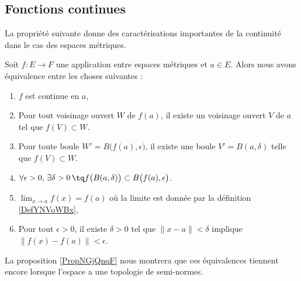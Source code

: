 \subsection{Fonctions continues}

La propriété suivante donne des caractérisations importantes de la continuité dans le cas des espaces métriques.
\begin{proposition} \label{PropQZRNpMn}
    Soit \( f\colon E\to F\) une application entre espaces métriques et \( a\in E\). Alors nous avons équivalence entre les choses suivantes :
    \begin{enumerate}
        \item\label{ItemCBUoRWJi}
            \( f\) est continue en \( a\),
        \item\label{ItemCBUoRWJii}
            Pour tout voisinage ouvert \( W\) de \( f(a)\), il existe un voisinage ouvert \( V\) de \( a\) tel que \( f(V)\subset W\).
        \item\label{ItemCBUoRWJiii}
            Pour toute boule \( W'=B\big( f(a),\epsilon \big)\), il existe une boule \( V'=B(a,\delta)\) telle que \( f(V)\subset W\).
        \item\label{ItemCBUoRWJiv}
            $\forall \epsilon>0,\,\exists \delta>0\,\tq f\big( B(a,\delta) \big)\subset B\big( f(a),\epsilon \big)$.
        \item\label{ItemYNQpikrii}
            \( \lim_{x\to a}f(x)=f(a)\) où la limite est donnée par la définition \ref{DefYNVoWBx},
        \item\label{ItemYNQpikriii}
            Pour tout \( \epsilon>0\), il existe \( \delta>0\) tel que \( \| x-a \|<\delta\) implique \( \| f(x)-f(a) \|<\epsilon\).
    \end{enumerate}
\end{proposition}
La proposition \ref{PropNGjQnqF} nous montrera que ces équivalences tiennent encore lorsque l'espace a une topologie de semi-normes.


